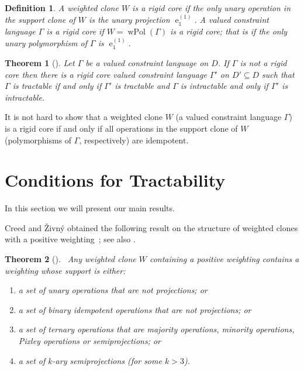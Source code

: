 \documentclass[11pt, reqno]{article}
\DeclareMathOperator{\proj}{\ensuremath{e}}
\DeclareMathOperator{\wpol}{wPol}
\newtheorem{theorem}{Theorem}%
\newtheorem{definition}{Definition}
\theoremstyle{remark}
\begin{document}
\begin{definition}
A weighted clone $W$ is a \emph{rigid core} if the only unary operation in the
support clone of $W$ is the unary projection $\proj^{(1)}_1$.
A valued constraint language $\Gamma$ is a rigid core if $W=\wpol(\Gamma)$ is a
rigid core; that is if the only unary polymorphism of $\Gamma$ is $\proj^{(1)}_1$.
\end{definition}
%

\begin{theorem}[\hspace*{-0.3em}\cite{Kozik15:icalp}]\label{thm:rigid}
%
Let $\Gamma$ be a valued constraint language on $D$. 
If $\Gamma$ is not a rigid core then there is a rigid core valued constraint language 
$\Gamma'$ on $D'\subseteq D$ such that $\Gamma$ is tractable if and only if
$\Gamma'$ is tractable and $\Gamma$ is intractable and only if $\Gamma'$ is
intractable.
%
\end{theorem}

It is not hard to show that a weighted clone $W$ (a valued constraint language
$\Gamma$) is a rigid core if and only if all operations in the support clone of $W$
(polymorphisms of $\Gamma$, respectively) are idempotent. 



\section{Conditions for Tractability}
\label{sec:wclones}

In this section we will present our main results.

Creed and \v{Z}ivn\'y obtained the following result on the structure of 
weighted clones with a positive weighting~\cite[Theorem~2]{cz11:cp-mwc}; see also
\cite[Corollary~7.7]{cccjz13:sicomp}.

\begin{theorem}[\hspace*{-0.3em}\cite{cz11:cp-mwc}]~\label{thm:class1}
%
Any weighted clone $W$ containing a positive weighting
contains a weighting whose support is either:
\begin{enumerate}
  \item a set of unary operations that are not projections; or
  \item a set of binary idempotent operations that are not projections; or
  \item a set of ternary operations that are majority operations, minority operations, Pixley operations or semiprojections; or
  \item a set of $k$-ary semiprojections (for some $k > 3$).
\end{enumerate}

\end{theorem}
\end{document}
